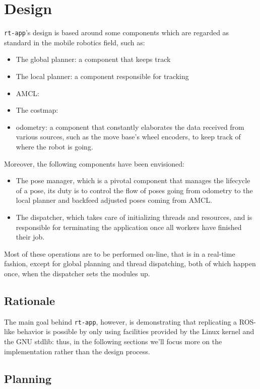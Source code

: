 \documentclass[a4paper,12pt]{report}
\begin{document}
\section{Design}

\texttt{rt-app}'s design is based around some components which are regarded as standard in the mobile robotics field, such as:
\begin{itemize}
\item The global planner: a component that keeps track
\item The local planner: a component responsible for tracking 
\item AMCL:
\item The costmap:
\item odometry: a component that constantly elaborates the data received from various sources, such as the move base's wheel encoders, to keep track of where the robot is going. 
\end{itemize}

Moreover, the following components have been envisioned:
\begin{itemize}
\item The pose manager, which is a pivotal component that manages the lifecycle of a pose, its duty is to control the flow of poses going from odometry to the local planner and backfeed adjusted poses coming from AMCL.
\item The dispatcher, which takes care of initializing threads and resources, and is responsible for terminating the application once all workers have finished their job.
\end{itemize}

Most of these operations are to be performed on-line, that is in a real-time fashion, except for global planning and thread dispatching, both of which happen once, when the dispatcher sets the modules up.

\subsection{Rationale}

The main goal behind \texttt{rt-app}, however, is demonstrating that replicating a ROS-like behavior is possible by only using facilities provided by the Linux kernel and the GNU stdlib: thus, in the following sections we'll focus more on the implementation rather than the design process.   

\subsection{Planning}
\end{document}
